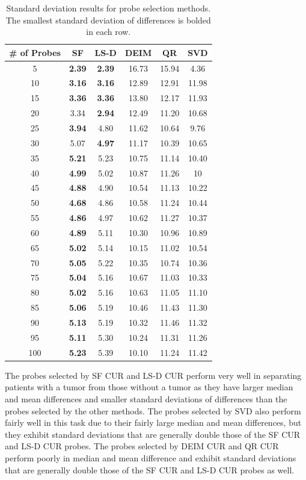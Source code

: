 \documentclass[12pt]{article}
\begin{document}
\begin{table}[h]
    \centering
    \small
    \begin{tabular}{|c|c|c|c|c|c|}
        \hline
         \textbf{\# of Probes} & \textbf{SF} & \textbf{LS-D} & \textbf{DEIM} & \textbf{QR} & \textbf{SVD} \\
        \hline
5 & \textbf{2.39} & \textbf{2.39} & 16.73 & 15.94 & 4.36 \\
10 & \textbf{3.16} & \textbf{3.16} & 12.89 & 12.91 & 11.98 \\
15 & \textbf{3.36} & \textbf{3.36} & 13.80 & 12.17 & 11.93 \\
20 & 3.34 & \textbf{2.94} & 12.49 & 11.20 & 10.68 \\
25 & \textbf{3.94} & 4.80 & 11.62 & 10.64 & 9.76 \\
30 & 5.07 & \textbf{4.97} & 11.17 & 10.39 & 10.65 \\
35 & \textbf{5.21} & 5.23 & 10.75 & 11.14 & 10.40 \\
40 & \textbf{4.99} & 5.02 & 10.87 & 11.26 & 10 \\
45 & \textbf{4.88} & 4.90 & 10.54 & 11.13 & 10.22 \\
50 & \textbf{4.68} & 4.86 & 10.58 & 11.24 & 10.44 \\
55 & \textbf{4.86} & 4.97 & 10.62 & 11.27 & 10.37 \\
60 & \textbf{4.89} & 5.11 & 10.30 & 10.96 & 10.89 \\
65 & \textbf{5.02} & 5.14 & 10.15 & 11.02 & 10.54 \\
70 & \textbf{5.05} & 5.22 & 10.35 & 10.74 & 10.36 \\
75 & \textbf{5.04} & 5.16 & 10.67 & 11.03 & 10.33 \\
80 & \textbf{5.02} & 5.16 & 10.63 & 11.05 & 11.10 \\
85 & \textbf{5.06} & 5.19 & 10.46 & 11.43 & 11.30 \\
90 & \textbf{5.13} & 5.19 & 10.32 & 11.46 & 11.32 \\
95 & \textbf{5.11} & 5.30 & 10.24 & 11.31 & 11.26 \\
100 & \textbf{5.23} & 5.39 & 10.10 & 11.24 & 11.42 \\
\hline
    \end{tabular}
    \caption{Standard deviation results for probe selection methods.  The smallest standard deviation of differences is bolded in each row.} 
    \label{tab:ps_sd}
\end{table}

The probes selected by SF CUR and LS-D CUR perform very well in separating patients with a tumor from those without a tumor as they have larger median and mean differences and smaller standard deviations of differences than the probes selected by the other methods.  The probes selected by SVD also perform fairly well in this task due to their fairly large median and mean differences, but they exhibit standard deviations that are generally double those of the SF CUR and LS-D CUR probes.  The probes selected by DEIM CUR and QR CUR perform poorly in median and mean difference and exhibit standard deviations that are generally double those of the SF CUR and LS-D CUR probes as well.  
\end{document}
